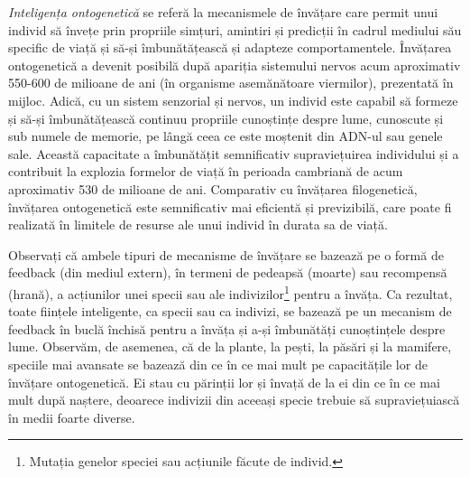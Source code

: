 \documentclass[../../book-main_ro.tex]{subfiles}
\begin{document}
{\em Inteligența ontogenetică} se referă la mecanismele de învățare care permit unui individ să învețe prin propriile simțuri, amintiri și predicții în cadrul mediului său specific de viață și să-și îmbunătățească și adapteze comportamentele. Învățarea ontogenetică a devenit posibilă după apariția sistemului nervos acum aproximativ 550-600 de milioane de ani (în organisme asemănătoare viermilor), prezentată în  mijloc. Adică, cu un sistem senzorial și nervos, un individ este capabil să formeze și să-și îmbunătățească continuu propriile cunoștințe despre lume, cunoscute și sub numele de memorie, pe lângă ceea ce este moștenit din ADN-ul sau genele sale. Această capacitate a îmbunătățit semnificativ supraviețuirea individului și a contribuit la explozia formelor de viață în perioada cambriană de acum aproximativ 530 de milioane de ani. Comparativ cu învățarea filogenetică, învățarea ontogenetică este semnificativ mai eficientă și previzibilă, care poate fi realizată în limitele de resurse ale unui individ în durata sa de viață.

Observați că ambele tipuri de mecanisme de învățare se bazează pe o formă de feedback (din mediul extern), în termeni de pedeapsă (moarte) sau recompensă (hrană), a acțiunilor unei specii sau ale indivizilor\footnote{Mutația genelor speciei sau acțiunile făcute de individ.} pentru a învăța. Ca rezultat, toate ființele inteligente, ca specii sau ca indivizi, se bazează pe un mecanism de feedback în buclă închisă pentru a învăța și a-și îmbunătăți cunoștințele despre lume. Observăm, de asemenea, că de la plante, la pești, la păsări și la mamifere, speciile mai avansate se bazează din ce în ce mai mult pe capacitățile lor de învățare ontogenetică. Ei stau cu părinții lor și învață de la ei din ce în ce mai mult după naștere, deoarece indivizii din aceeași specie trebuie să supraviețuiască în medii foarte diverse.
\end{document}
